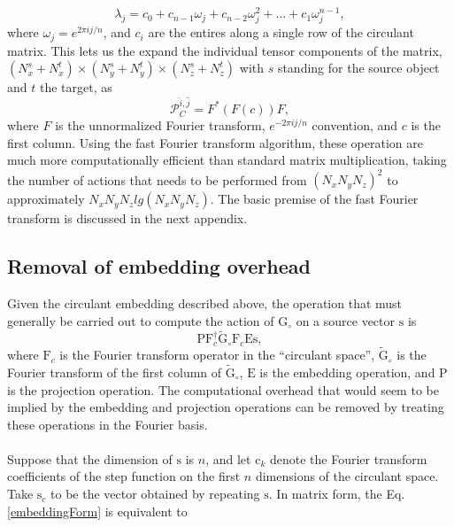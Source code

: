 \documentclass[reprint,aps,prb]{revtex4-2}
\newcommand{\bmm}[1]{\bm{\mathrm{#1}}}
\DeclareMathOperator{\diag}{\text{diag}}
\begin{document}
\begin{equation}
	\lambda_{j}=c_{0}+c_{n-1}\omega_{j}+c_{n-2}\omega_{j}^{2}+\ldots+c_{1}\omega_{j}^{n-1},  	
	\label{eigen}
\end{equation}  
where $\omega_{j}=e^{2\pi i j/n}$, and $c_{i}$ are the entires along a single row of the circulant matrix. This lets us the expand the individual tensor components of the matrix, $\left(N_{x}^{s}+N_{x}^{t}\right)\times \left(N^{s}_{y}+N^{t}_{y}\right) \times \left(N^{s}_{z}+N^{t}_{z}\right)$ with $s$ standing for the source object and $t$ the target, as 
\begin{equation}
 \mathcal{P}^{\hat{i},\hat{j}}_{C}=F^{*}\left(F \left(c\right)\right)F,
\label{circulantFourier}
\end{equation}
where $F$ is the unnormalized Fourier transform, $e^{-2\pi i j/n}$ convention, and $c$ is the first column. Using the fast Fourier transform algorithm, these operation are much more computationally efficient than standard matrix multiplication, taking the number of actions that needs to be performed from $\left(N_{x}N_{y}N_{z}\right)^{2}$ to approximately $N_{x}N_{y}N_{z}lg\left(N_{x}N_{y}N_{z}\right)$. The basic premise of the fast Fourier transform is discussed in the next appendix.   
\subsection{Removal of embedding overhead}
\noindent
Given the circulant embedding described above, the operation that must generally be carried out to compute the action of $\bmm{G}_{\circ}$ on a source vector $\bmm{s}$ is 
\begin{equation}
	\bmm{P}\bmm{F}^{\dagger}_{c}\tilde{\bmm{G}}_{\circ}\bmm{F}_{c}\bmm{E}\bmm{s},
	\label{embeddingForm}
\end{equation}
where $\bmm{F}_{c}$ is the Fourier transform operator in the ``circulant space'', $\tilde{\bmm{G}}_{\circ}$ is the Fourier transform of the first column of $\tilde{\bmm{G}}_{\circ}$, $\bmm{E}$ is the embedding operation, and $\bmm{P}$ is the projection operation. 
The computational overhead that would seem to be implied by the embedding and projection operations can be removed by treating these operations in the Fourier basis. 
\\ \\
Suppose that the dimension of $\bmm{s}$ is $n$, and let $\bmm{c}_{k}$ denote the Fourier transform coefficients of the step function on the first $n$ dimensions of the circulant space. 
Take $\bmm{s}_{c}$ to be the vector obtained by repeating $\bmm{s}$. 
In matrix form, the Eq.\eqref{embeddingForm} is equivalent to
		
\end{document}
